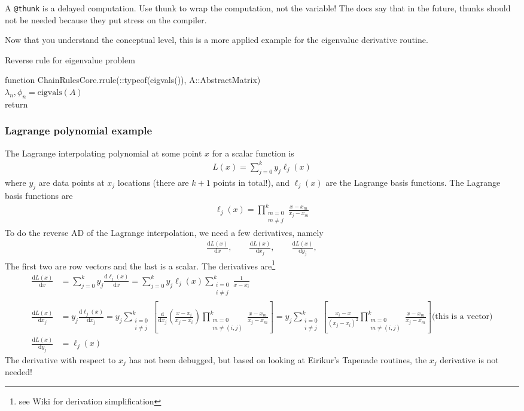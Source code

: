 \documentclass[10pt]{article}
\newcommand{\dd}[2]{\frac{\textrm{d} #1}{\textrm{d} #2}}
\newcommand{\ben}{\begin{eqnarray*}}
\newcommand{\een}{\end{eqnarray*}}
\newcommand{\beq}{\begin{equation}\begin{aligned}}
\newcommand{\eeq}{\end{aligned}\end{equation}}
\newcommand{\tn}[1]{\textrm{#1}}
\begin{document}
A \texttt{@thunk} is a delayed computation.
Use thunk to wrap the computation, not the variable!
The docs say that in the future, thunks should not be needed because they put stress on the compiler.

Now that you understand the conceptual level, this is a more applied example for the eigenvalue derivative routine.
\begin{algorithm}[htb!]
	\caption{\label{alg:EigenRAD} Reverse rule for eigenvalue problem}
	function ChainRulesCore.rrule(::typeof(eigvals()), A::AbstractMatrix)\\
	\quad $\lambda_n, \phi_n = \tn{eigvals}(A)$ \\
	return
\end{algorithm}

\subsubsection{Lagrange polynomial example}

The Lagrange interpolating polynomial at some point $x$ for a scalar function is
\beq
L(x) = \sum_{j=0}^{k} y_j \ell_j(x)
\eeq
where $y_j$ are data points at $x_j$ locations (there are $k+1$ points in total!), and $\ell_j(x)$ are the Lagrange basis functions.
The Lagrange basis functions are
\beq
\ell_j(x) = \prod_{\substack{m=0 \\ m \neq j}}^{k} \frac{x-x_m}{x_j-x_m}
\eeq
To do the reverse AD of the Lagrange interpolation, we need a few derivatives, namely
\ben
\dd{L(x)}{x},
\qquad
\dd{L(x)}{x_j},
\qquad
\dd{L(x)}{y_j},
\een
The first two are row vectors and the last is a scalar.
The derivatives are\footnote{see Wiki for derivation simplification}
\beq
\dd{L(x)}{x} &= \sum_{j=0}^{k} y_j \dd{\ell_j(x)}{x}
=
\sum_{j=0}^{k} y_j { \ell_j(x) \sum_{\substack{i=0\\i\neq j}}^{k} \frac{1}{x - x_i}}
\\
\dd{L(x)}{x_j} &=  y_j \dd{\ell_j(x)}{x_j} =
y_j \sum_{\substack{i=0 \\ i \neq j}}^{k} \left[
	\dd{}{x_j}\left(
	\frac{x-x_i}{x_j-x_i}
	\right)
	\prod_{\substack{m=0 \\m\neq (i,j)}}^{k} \frac{x-x_m}{x_j-x_m}
	\right]
=
y_j \sum_{\substack{i=0 \\ i \neq j}}^{k} \left[
	\frac{x_i - x}{(x_j-x_i)^2} \prod_{\substack{m=0 \\m\neq (i,j)}}^{k} \frac{x-x_m}{x_j-x_m}
	\right]
\tn{(this is a vector)}
\\
\dd{L(x)}{y_j} &=  \ell_j(x)
\eeq
The derivative with respect to $x_j$ has not been debugged, but based on looking at Eirikur's Tapenade routines, the $x_j$ derivative is not needed!
\end{document}
